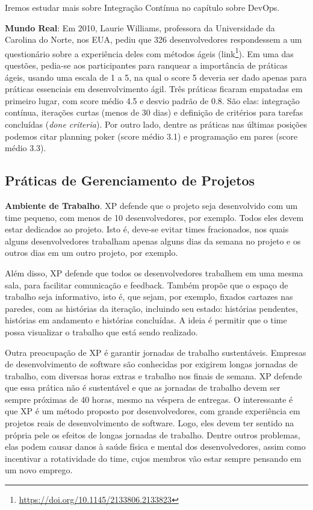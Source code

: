 \documentclass[
  11pt,
  twoside]{book}
\DeclareRobustCommand{\href}[2]{#2\footnote{\url{#1}}}
\newenvironment{esmbox}{\centering \vspace{1.5ex} \begin{tcolorbox}[breakable, colback=backcolor, width=4.9in]}{\end{tcolorbox} \vspace{1.5ex}}
\begin{document}
Iremos estudar mais sobre Integração Contínua no capítulo sobre DevOps.

\begin{esmbox}

\textbf{Mundo Real}: Em 2010, Laurie Williams, professora da
Universidade da Carolina do Norte, nos EUA, pediu que 326
desenvolvedores respondessem a um questionário sobre a experiência deles
com métodos ágeis
(\href{https://doi.org/10.1145/2133806.2133823}{link}). Em uma das
questões, pedia-se aos participantes para ranquear a importância de
práticas ágeis, usando uma escala de 1 a 5, na qual o score 5 deveria
ser dado apenas para práticas essenciais em desenvolvimento ágil. Três
práticas ficaram empatadas em primeiro lugar, com score médio 4.5 e
desvio padrão de 0.8. São elas: integração contínua, iterações curtas
(menos de 30 dias) e definição de critérios para tarefas concluídas
(\emph{done criteria}). Por outro lado, dentre as práticas nas últimas
posições podemos citar planning poker (score médio 3.1) e programação em
pares (score médio 3.3).

\end{esmbox}

\hypertarget{pruxe1ticas-de-gerenciamento-de-projetos}{%
\subsection{Práticas de Gerenciamento de
Projetos}\label{pruxe1ticas-de-gerenciamento-de-projetos}}

 \textbf{Ambiente de
Trabalho}. XP defende que o projeto seja desenvolvido com um time
pequeno, com menos de 10 desenvolvedores, por exemplo. Todos eles devem
estar dedicados ao projeto. Isto é, deve-se evitar times fracionados,
nos quais alguns desenvolvedores trabalham apenas alguns dias da semana
no projeto e os outros dias em um outro projeto, por exemplo.

Além disso, XP defende que todos os desenvolvedores trabalhem em uma
mesma sala, para facilitar comunicação e feedback. Também propõe que o
espaço de trabalho seja informativo, isto é, que sejam, por exemplo,
fixados cartazes nas paredes, com as histórias da iteração, incluindo
seu estado: histórias pendentes, histórias em andamento e histórias
concluídas. A ideia é permitir que o time possa visualizar o trabalho
que está sendo realizado.

Outra preocupação de XP é garantir jornadas de trabalho sustentáveis.
Empresas de desenvolvimento de software são conhecidas por exigirem
longas jornadas de trabalho, com diversas horas extras e trabalho nos
finais de semana. XP defende que essa prática não é sustentável e que as
jornadas de trabalho devem ser sempre próximas de 40 horas, mesmo na
véspera de entregas. O interessante é que XP é um método proposto por
desenvolvedores, com grande experiência em projetos reais de
desenvolvimento de software. Logo, eles devem ter sentido na própria
pele os efeitos de longas jornadas de trabalho. Dentre outros problemas,
elas podem causar danos à saúde física e mental dos desenvolvedores,
assim como incentivar a rotatividade do time, cujos membros vão estar
sempre pensando em um novo emprego.
\end{document}
